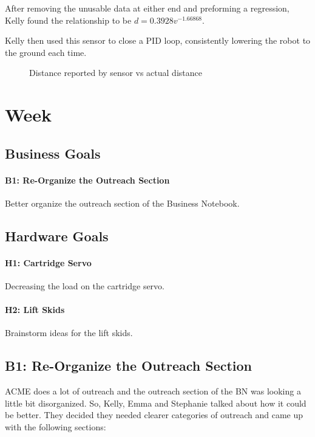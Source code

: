 \documentclass{article}
\begin{document}
After removing the unusable data at either end and preforming a regression, Kelly found the relationship to be $d=0.3928 v^{-1.66868}$. 

Kelly then used this sensor to close a PID loop, consistently lowering the robot to the ground each time.


\begin {figure}
\centering
{}
\caption {Distance reported by sensor vs actual distance}
\label {fig:graph}
\end{figure}
\clearpage \newpage \section{Week \thesection} 
\subsection{Business Goals}
\paragraph{B1: Re-Organize the Outreach Section}
 Better organize the outreach section of the Business Notebook. 
\subsection{Hardware Goals}
\paragraph{H1: Cartridge Servo}
 Decreasing the load on the cartridge servo.
\paragraph{H2: Lift Skids}
 Brainstorm ideas for the lift skids.
\newpage
\subsection{B1: Re-Organize the Outreach Section}

ACME does a lot of outreach and the outreach section of the BN was looking a little bit disorganized. So, Kelly, Emma and Stephanie talked about how it could be better. They decided they needed clearer categories of outreach and came up with the following sections: 
\end{document}
